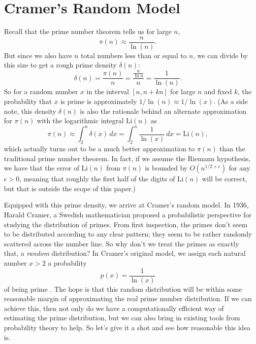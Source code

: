 \documentclass[conference]{IEEEtran}
\begin{document}
\section{Cramer's Random Model}
Recall that the prime number theorem tells us for
large $n$,
\[\pi(n) \approx \frac{n}{\ln(n)}.\]
But since we also have $n$ total numbers less than or equal to
$n$, we can divide by this size to get a rough prime density
$\delta(n)$:
\[\delta(n) = \frac{\pi(n)}{n} = \frac{\frac{n}{\ln{n}}}{n} = \frac{1}{\ln(n)}.\]
So for a random number $x$ in the interval $[n, n + kn]$ for
large $n$ and fixed $k$, the probability that $x$ is prime is
approximately $1 / \ln(n) \approx 1 / \ln(x)$. (As a side note, this
density $\delta(n)$ is also the rationale behind an alternate
approximation for $\pi(n)$ with the logarithmic integral
$\mathrm{Li}(n)$ as
\[\pi(n) \approx \int_2^{n} \delta(x)\, dx = \int_2^{n} \frac{1}{\ln(x)}\, dx = \mathrm{Li}(n),\]
which actually turns out to be a much better approximation to
$\pi(n)$ than the traditional prime number theorem. In
fact, if we assume the
Riemann hypothesis, we have that the error of $\mathrm{Li}(n)$ from
$\pi(n)$ is bounded by $O(n^{1/2 + \epsilon})$ for any
$\epsilon > 0$, meaning that roughly the first half of the
digits of
$\mathrm{Li}(n)$ will be correct,
but that is outside the scope of this paper.)

Equipped with this prime density, we arrive at
Cramer's random model. In 1936, Harald Cramer, a Swedish mathematician
proposed a probabilistic perspective for studying
the distribution of primes. From first inspection,
the primes don't seem to be distributed according to
any clear pattern; they seem to be rather randomly
scattered across the number line. So why don't
we treat the primes as exactly that, a \textit{random} distribution?
In Cramer's original model, we assign each natural number
$x > 2$ a probability
\[p(x) = \frac{1}{\ln(x)}\]
of being prime \cite{b4}.
The hope is that this random distribution will be within
some reasonable margin of approximating the real prime
number distribution. If we can achieve this, then not only
do we have a computationally efficient way of
estimating the prime distribution, but we can also bring
in existing tools from probability theory to help. So
let's give it a shot and see how reasonable this idea is.
\end{document}
